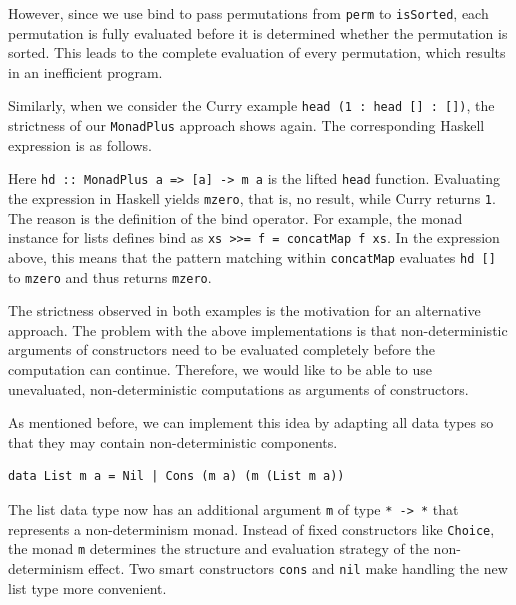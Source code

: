 \documentclass[a4paper, 11pt, fleqn, twoside]{scrreprt}
\begin{document}
However, since we use bind to pass permutations from \texttt{perm} 
to \texttt{isSorted}, each permutation is fully evaluated before 
it is determined whether the permutation is sorted. This leads to the complete 
evaluation of every permutation, which results in an inefficient program.

Similarly, when we consider the Curry example \texttt{head (1 : 
head [] : [])}, the strictness of our \texttt{MonadPlus} approach 
shows again. The corresponding Haskell expression is as follows.


Here \texttt{hd :: MonadPlus a => [a] -> m a} is the lifted 
\texttt{head} function. Evaluating the expression in Haskell 
yields \texttt{mzero}, that is, no result, while Curry returns 
\texttt{1}. The reason is the definition of the bind operator. For 
example, the monad instance for lists defines bind as \texttt{xs 
>>= f = concatMap f xs}. In the expression above, this means that the pattern 
matching within \texttt{concatMap} evaluates 
\texttt{hd []} to \texttt{mzero} and thus returns 
\texttt{mzero}.

The strictness observed in both examples is the motivation for an alternative 
approach. The problem with the above implementations is that non-deterministic 
arguments of constructors need to be evaluated completely before the 
computation can continue. Therefore, we would like to be able to use 
unevaluated, non-deterministic computations as arguments of constructors.

As mentioned before, we can implement this idea by adapting all data types so 
that they may contain non-deterministic components.

\begin{verbatim}
data List m a = Nil | Cons (m a) (m (List m a))
\end{verbatim}

The list data type now has an additional argument \texttt{m} of 
type \texttt{* -> *} that represents a non-determinism monad. 
Instead of fixed constructors like \texttt{Choice}, the monad 
\texttt{m} determines the structure and evaluation strategy 
of the non-determinism effect. Two smart constructors 
\texttt{cons} and \texttt{nil} make handling the new 
list type more convenient.
\end{document}
